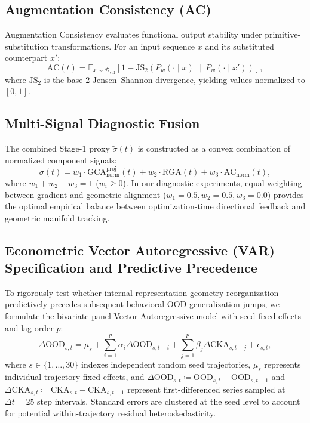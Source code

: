 \documentclass{article}
\theoremstyle{plain}
\theoremstyle{definition}
\begin{document}
\subsection{Augmentation Consistency (AC)}
Augmentation Consistency evaluates functional output stability under primitive-substitution transformations. For an input sequence $x$ and its substituted counterpart $x'$:
\begin{equation}
    \text{AC}(t) = \mathbb{E}_{x \sim \mathcal{D}_{\text{val}}} \left[ 1 - \text{JS}_2\left( P_w(\cdot \mid x) \,\|\, P_w(\cdot \mid x') \right) \right],
    \label{eq:app_ac}
\end{equation}
where $\text{JS}_2$ is the base-2 Jensen--Shannon divergence, yielding values normalized to $[0, 1]$.

\subsection{Multi-Signal Diagnostic Fusion}
The combined Stage-1 proxy $\tilde{\sigma}(t)$ is constructed as a convex combination of normalized component signals:
\begin{equation}
    \tilde{\sigma}(t) = w_1 \cdot \text{GCA}_{\text{norm}}^{\text{proj}}(t) + w_2 \cdot \text{RGA}(t) + w_3 \cdot \text{AC}_{\text{norm}}(t),
    \label{eq:app_proxy_fusion}
\end{equation}
where $w_1 + w_2 + w_3 = 1$ ($w_i \ge 0$). In our diagnostic experiments, equal weighting between gradient and geometric alignment ($w_1 = 0.5, w_2 = 0.5, w_3 = 0.0$) provides the optimal empirical balance between optimization-time directional feedback and geometric manifold tracking.

\subsection{Econometric Vector Autoregressive (VAR) Specification and Predictive Precedence}
To rigorously test whether internal representation geometry reorganization predictively precedes subsequent behavioral OOD generalization jumps, we formulate the bivariate panel Vector Autoregressive model with seed fixed effects and lag order $p$:
\begin{equation}
    \Delta \text{OOD}_{s, t} = \mu_s + \sum_{i=1}^p \alpha_i \Delta \text{OOD}_{s, t-i} + \sum_{j=1}^p \beta_j \Delta \text{CKA}_{s, t-j} + \epsilon_{s, t},
    \label{eq:var_granger}
\end{equation}
where $s \in \{1, \dots, 30\}$ indexes independent random seed trajectories, $\mu_s$ represents individual trajectory fixed effects, and $\Delta \text{OOD}_{s, t} \coloneqq \text{OOD}_{s, t} - \text{OOD}_{s, t-1}$ and $\Delta \text{CKA}_{s, t} \coloneqq \text{CKA}_{s, t} - \text{CKA}_{s, t-1}$ represent first-differenced series sampled at $\Delta t = 25$ step intervals. Standard errors are clustered at the seed level to account for potential within-trajectory residual heteroskedasticity.
\end{document}
